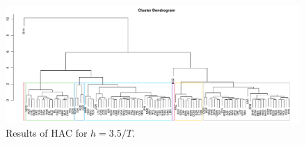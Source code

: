 \documentclass[a4paper,12pt]{article}
\numberwithin{equation}{section}
\begin{document}






\newpage 
\FloatBarrier
\begin{figure}
\includegraphics[width=\textwidth]{plots/7days/dendrogram}
\caption{Results of HAC for $h = 3.5/T$.}\label{fig:dend}
\end{figure}
\end{document}
